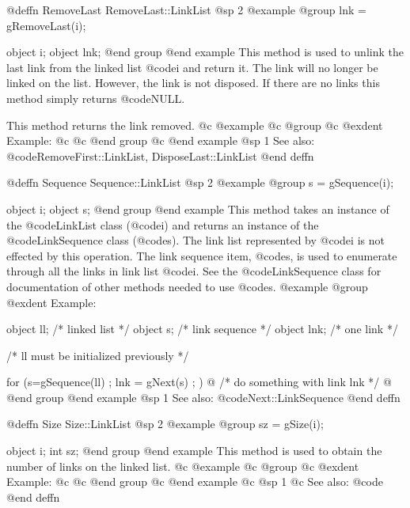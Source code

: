 @deffn {RemoveLast} RemoveLast::LinkList
@sp 2
@example
@group
lnk = gRemoveLast(i);

object  i;
object  lnk;
@end group
@end example
This method is used to unlink the last link from the linked list
@code{i} and return it.  The link will no longer be linked on the list.
However, the link is not disposed.  If there are no links this method
simply returns @code{NULL}.

This method returns the link removed.
@c @example
@c @group
@c @exdent Example:
@c 
@c @end group
@c @end example
@sp 1
See also:  @code{RemoveFirst::LinkList, DisposeLast::LinkList}
@end deffn










@deffn {Sequence} Sequence::LinkList
@sp 2
@example
@group
s = gSequence(i);

object  i;
object  s;
@end group
@end example
This method takes an instance of the @code{LinkList} class (@code{i})
and returns an instance of the @code{LinkSequence} class (@code{s}).
The link list represented by @code{i} is not effected by this operation.
The link sequence item, @code{s}, is used to enumerate through all the
links in link list @code{i}.  See the @code{LinkSequence} class for
documentation of other methods needed to use @code{s}.
@example
@group
@exdent Example:

object  ll;  /*  linked list    */
object  s;   /*  link sequence  */
object  lnk; /*  one link       */

/*  ll must be initialized previously  */

for (s=gSequence(ll) ; lnk = gNext(s) ; )  @{
        /*  do something with link lnk  */
@}
@end group
@end example
@sp 1
See also:  @code{Next::LinkSequence}
@end deffn

















@deffn {Size} Size::LinkList
@sp 2
@example
@group
sz = gSize(i);

object  i;
int     sz;
@end group
@end example
This method is used to obtain the number of links on the linked list.
@c @example
@c @group
@c @exdent Example:
@c 
@c @end group
@c @end example
@c @sp 1
@c See also:  @code{}
@end deffn












